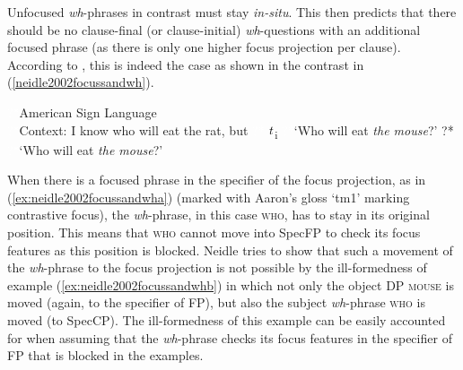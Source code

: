 \noindent Unfocused \textit{wh}-phrases in contrast must stay \textit{in-situ}. This then predicts that there should be no clause-final (or clause-initial) \textit{wh}-questions with an additional focused phrase (as there is only one higher focus projection per clause). According to \citet[83]{neidle2002language}, this is indeed the case as shown in the contrast in (\ref{neidle2002focussandwh}).

\begin{exe}
\ex\label{neidle2002focussandwh}\begin{xlist} 
\sn \textcolor{white}{?*}American Sign Language \citep[83]{neidle2002language}  \\ \textcolor{white}{?*}Context: I know who will eat the rat, but
\ex \textcolor{white}{?*}  $\textrm{\textit{t}}$\textsubscript{i}
\glt \textcolor{white}{?*}`Who will eat \textit{the mouse}?' \label{ex:neidle2002focussandwha} 
\ex ?* 
\glt \textcolor{white}{?*}`Who will eat \textit{the mouse}?' \label{ex:neidle2002focussandwhb} 
\end{xlist}
\end{exe}



\noindent When there is a focused phrase in the specifier of the focus projection, as in (\ref{ex:neidle2002focussandwha}) (marked with Aaron's gloss `tm1' marking contrastive focus), the \textit{wh}-phrase, in this case \textsc{who}, has to stay in its original position. This means that \textsc{who} cannot move into SpecFP to check its focus features as this position is blocked. Neidle tries to show that such a movement of the \textit{wh}-phrase to the focus projection is not possible by the ill-formedness of example (\ref{ex:neidle2002focussandwhb}) in which not only the object DP \textsc{mouse} is moved (again, to the specifier of FP), but also the subject \textit{wh}-phrase \textsc{who} is moved (to SpecCP). The ill-formedness of this example can be easily accounted for when assuming that the \textit{wh}-phrase checks its focus features in the specifier of FP that is blocked in the examples.

